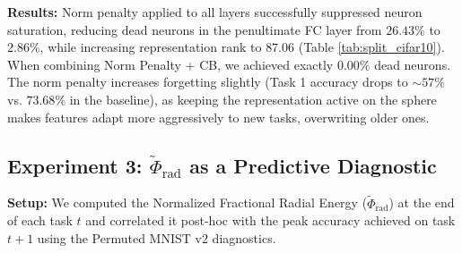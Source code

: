 \documentclass[11pt,a4paper]{article}
\begin{document}
\textbf{Results:} Norm penalty applied to all layers successfully suppressed neuron saturation, reducing dead neurons in the penultimate FC layer from $26.43\%$ to $2.86\%$, while increasing representation rank to $87.06$ (Table \ref{tab:split_cifar10}). When combining Norm Penalty + CB, we achieved exactly $0.00\%$ dead neurons. The norm penalty increases forgetting slightly (Task 1 accuracy drops to $\sim57\%$ vs. $73.68\%$ in the baseline), as keeping the representation active on the sphere makes features adapt more aggressively to new tasks, overwriting older ones.

\begin{table}[ht]
\centering
\caption{Split CIFAR-10 results (4-layer CNN, 5 tasks, 3 seeds).}
\label{tab:split_cifar10}
\end{table}

\subsection{Experiment 3: $\tilde{\Phi}_{\text{rad}}$ as a Predictive Diagnostic}
\textbf{Setup:} We computed the Normalized Fractional Radial Energy ($\tilde{\Phi}_{\text{rad}}$) at the end of each task $t$ and correlated it post-hoc with the peak accuracy achieved on task $t+1$ using the Permuted MNIST v2 diagnostics.
\end{document}
